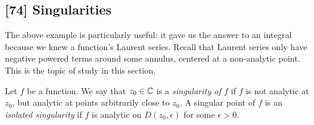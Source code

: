 \documentclass{article}
\begin{document}
\subsection*{[74] Singularities}
The above example is particularly useful: it gave us the answer to an integral because we knew a function's Laurent series. Recall that Laurent series only have negative powered terms around some annulus, centered at a non-analytic point. This is the topic of study in this section.
\begin{definition}
Let $f$ be a function. We say that $z_0\in\mathbb C$ is a \textit{singularity of $f$} if $f$ is not analytic at $z_0$, but analytic at points arbitrarily close to $z_0$. A singular point of $f$ is an \textit{isolated singularity} if $f$ is analytic on $D(z_0, \epsilon)$ for some $\epsilon>0$.
\end{definition}
\newpage
\end{document}
